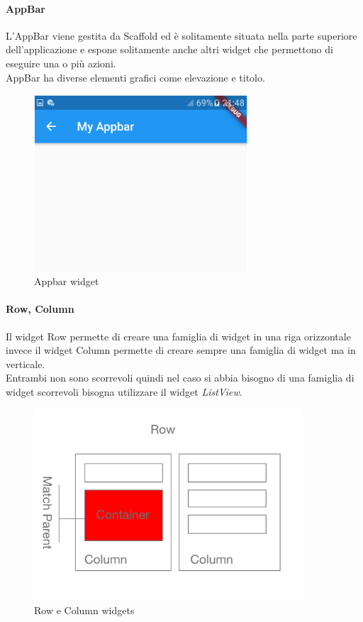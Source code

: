 \newpage

\paragraph{AppBar}
L'AppBar viene gestita da Scaffold ed è solitamente situata nella parte superiore dell'applicazione e espone solitamente anche altri widget che permettono di eseguire una o più azioni.\\
AppBar ha diverse elementi grafici come elevazione e titolo.
\begin{figure}[htbp]	
	\centering
	\includegraphics[width=8cm]{immagini/appbar.png}
	\caption{Appbar widget}
	\label{fig:Appbar widget}
\end{figure}

\paragraph{Row, Column}
Il widget Row permette di creare una famiglia di widget in una riga orizzontale invece il widget Column permette di creare sempre una famiglia di widget ma in verticale.\\
Entrambi non sono scorrevoli quindi nel caso si abbia bisogno di una famiglia di widget scorrevoli bisogna utilizzare il widget \textit{ListView}.
\begin{figure}[htbp]	
	\centering
	\includegraphics[width=10cm]{immagini/rowcolumn.png}
	\caption{Row e Column widgets}
	\label{fig:Row e Column widgets}
\end{figure}

